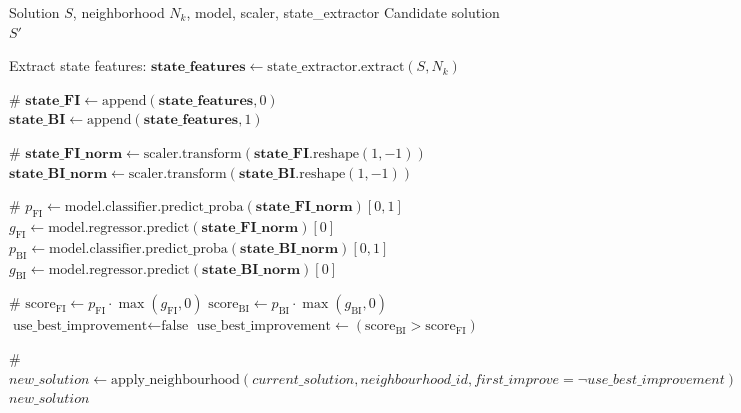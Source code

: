 \documentclass{article}
\begin{document}
\begin{algorithm}[H]
\caption{RF-Integrated Neighborhood Exploration}
\begin{algorithmic}[1]
\Require Solution $S$, neighborhood $N_k$, model, scaler, state\_extractor
\Ensure Candidate solution $S'$

\State Extract state features: $\mathbf{state\_features} \gets \text{state\_extractor.extract}(S, N_k)$
\State \phantom{}

\State \# 
\State $\mathbf{state\_FI} \gets \text{append}(\mathbf{state\_features}, 0)$
\State $\mathbf{state\_BI} \gets \text{append}(\mathbf{state\_features}, 1)$
\State \phantom{}

\State \# 
\State $\mathbf{state\_FI\_norm} \gets \text{scaler.transform}(\mathbf{state\_FI}.\text{reshape}(1, -1))$
\State $\mathbf{state\_BI\_norm} \gets \text{scaler.transform}(\mathbf{state\_BI}.\text{reshape}(1, -1))$
\State \phantom{}

\State \# 
\State $p_{\text{FI}} \gets \text{model.classifier.predict\_proba}(\mathbf{state\_FI\_norm})[0, 1]$
\State $g_{\text{FI}} \gets \text{model.regressor.predict}(\mathbf{state\_FI\_norm})[0]$
\State \phantom{}
\State $p_{\text{BI}} \gets \text{model.classifier.predict\_proba}(\mathbf{state\_BI\_norm})[0, 1]$
\State $g_{\text{BI}} \gets \text{model.regressor.predict}(\mathbf{state\_BI\_norm})[0]$
\State \phantom{}

\State \# 
\State $\text{score}_{\text{FI}} \gets p_{\text{FI}} \cdot \max(g_{\text{FI}}, 0)$
\State $\text{score}_{\text{BI}} \gets p_{\text{BI}} \cdot \max(g_{\text{BI}}, 0)$
\State \phantom{}
    \State $\text{use\_best\_improvement} \gets \text{false}$
\Else
    \State $\text{use\_best\_improvement} \gets (\text{score}_{\text{BI}} > \text{score}_{\text{FI}})$
\EndIf
\State \phantom{}

\State \# 
\State $new\_solution \gets \text{apply\_neighbourhood}(current\_solution, neighbourhood\_id, first\_improve=\neg use\_best\_improvement)$
\State \Return $new\_solution$
\end{algorithmic}
\end{algorithm}
\end{document}
